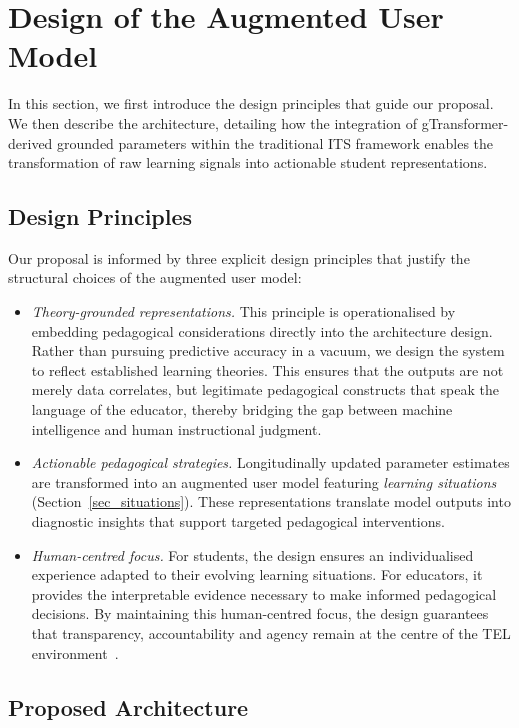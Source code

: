 \documentclass[runningheads]{llncs}
\begin{document}
%
\section{Design of the Augmented User Model}
\label{sec_grounded}

In this section, we first introduce the design principles that guide our proposal. We then describe the architecture, detailing how the integration of gTransformer-derived grounded parameters within the traditional ITS framework enables the transformation of raw learning signals into actionable student representations.

\subsection{Design Principles}

Our proposal is informed by three explicit design principles that justify the structural choices of the augmented user model:

\begin{itemize}
\item \textit{Theory-grounded representations.} This principle is operationalised by embedding pedagogical considerations directly into the architecture design. Rather than pursuing predictive accuracy in a vacuum, we design the system to reflect established learning theories. This ensures that the outputs are not merely data correlates, but legitimate pedagogical constructs that speak the language of the educator, thereby bridging the gap between machine intelligence and human instructional judgment.
\item \textit{Actionable pedagogical strategies.} Longitudinally updated parameter estimates are transformed into an augmented user model featuring \textit{learning situations} (Section~\ref{sec_situations}). These representations translate model outputs into diagnostic insights that support targeted pedagogical interventions.
\item \textit{Human-centred focus.} For students, the design ensures an individualised experience adapted to their evolving learning situations. For educators, it provides the interpretable evidence necessary to make informed pedagogical decisions. By maintaining this human-centred focus, the design guarantees that transparency, accountability and agency remain at the centre of the TEL environment~\cite{Holmes2022504}.
\end{itemize}

\subsection{Proposed Architecture}
\end{document}
